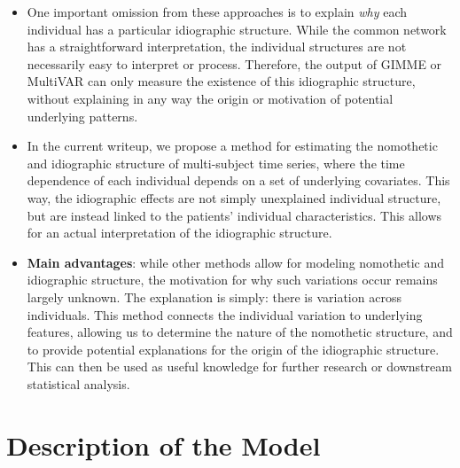 \begin{itemize}
	
	\item One important omission from these approaches is to explain \textit{why} each individual has a particular idiographic structure. While the common network has a straightforward interpretation, the individual structures are not necessarily easy to interpret or process. Therefore, the output of GIMME or MultiVAR can only measure the existence of this idiographic structure, without explaining in any way the origin or motivation of potential underlying patterns.
	
	\item In the current writeup, we propose a method for estimating the nomothetic and idiographic structure of multi-subject time series, where the time dependence of each individual depends on a set of underlying covariates. This way, the idiographic effects are not simply unexplained individual structure, but are instead linked to the patients' individual characteristics. This allows for an actual interpretation of the idiographic structure. 
	
	\item \textbf{Main advantages}: while other methods allow for modeling nomothetic and idiographic structure, the motivation for why such variations occur remains largely unknown. The explanation is simply: there is variation across individuals. This method connects the individual variation to underlying features, allowing us to determine the nature of the nomothetic structure, and to provide potential explanations for the origin of the idiographic structure. This can then be used as useful knowledge for further research or downstream statistical analysis.
\end{itemize}


\section{Description of the Model}


